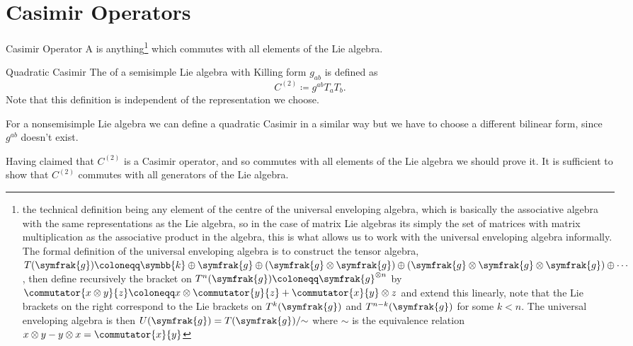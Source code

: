 \documentclass[fleqn]{NotesClass}
\renewcommand{\lie}[1]{\symfrak{#1}}
\renewcommand{\field}{\symbb{k}}
\begin{document}
    \section{Casimir Operators}
    \begin{dfn}{Casimir Operator}{}
        A  is anything\footnote{the technical definition being any element of the centre of the universal enveloping algebra, which is basically the associative algebra with the same representations as the Lie algebra, so in the case of matrix Lie algebras its simply the set of matrices with matrix multiplication as the associative product in the algebra, this is what allows us to work with the universal enveloping algebra informally. The formal definition of the universal enveloping algebra is to construct the tensor algebra, \(T(\lie{g}) \coloneqq \field \oplus \lie{g} \oplus (\lie{g} \otimes \lie{g}) \oplus (\lie{g} \otimes \lie{g} \otimes \lie{g}) \oplus \dotsb\), then define recursively the bracket on \(T^n(\lie{g}) \coloneqq \lie{g}^{\otimes n}\) by \(\commutator{x\otimes y}{z} \coloneqq x \otimes \commutator{y}{z} + \commutator{x}{y}\otimes z\) and extend this linearly, note that the Lie brackets on the right correspond to the Lie brackets on \(T^k(\lie{g})\) and \(T^{n - k}(\lie{g})\) for some \(k < n\). The universal enveloping algebra is then \(U(\lie{g}) = T(\lie{g})/{\sim}\) where \(\sim\) is the equivalence relation \(x \otimes y - y \otimes x = \commutator{x}{y}\)} which commutes with all elements of the Lie algebra.
    \end{dfn}
    
    \begin{dfn}{Quadratic Casimir}{}
        The  of a semisimple Lie algebra with Killing form \(g_{ab}\) is defined as
        \begin{equation}
            C^{(2)} \coloneqq g^{ab}T_aT_b.
        \end{equation}
        Note that this definition is independent of the representation we choose.
    \end{dfn}
    
    For a nonsemisimple Lie algebra we can define a quadratic Casimir in a similar way but we have to choose a different bilinear form, since \(g^{ab}\) doesn't exist.
    
    Having claimed that \(C^{(2)}\) is a Casimir operator, and so commutes with all elements of the Lie algebra we should prove it.
    It is sufficient to show that \(C^{(2)}\) commutes with all generators of the Lie algebra.
    
\end{document}
